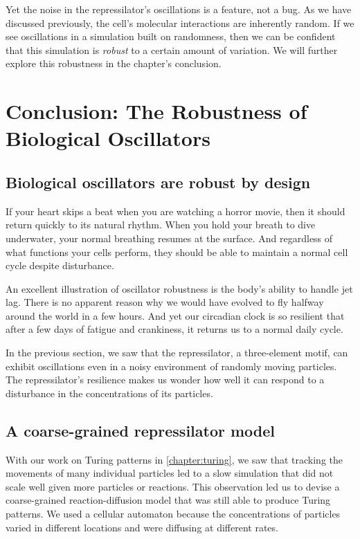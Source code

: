Yet the noise in the repressilator's oscillations is a feature, not a bug. As we have discussed previously, the cell's molecular interactions are inherently random. If we see oscillations in a simulation built on randomness, then we can be confident that this simulation is \textit{robust} to a certain amount of variation. We will further explore this robustness in the chapter's conclusion.\\

\FloatBarrier
{}

\section{Conclusion: The Robustness of Biological Oscillators}
\label{sec:biological_oscillators_must_be_robust}

\subsection{Biological oscillators are robust by design}

If your heart skips a beat when you are watching a horror movie, then it should return quickly to its natural rhythm. When you hold your breath to dive underwater, your normal breathing resumes at the surface. And regardless of what functions your cells perform, they should be able to maintain a normal cell cycle despite disturbance.

An excellent illustration of oscillator robustness is the body's ability to handle jet lag. There is no apparent reason why we would have evolved to fly halfway around the world in a few hours. And yet our circadian clock is so resilient that after a few days of fatigue and crankiness, it returns us to a normal daily cycle.

In the previous section, we saw that the repressilator, a three-element motif, can exhibit oscillations even in a noisy environment of randomly moving particles. The repressilator's resilience makes us wonder how well it can respond to a disturbance in the concentrations of its particles.

\FloatBarrier
{}
\subsection{A coarse-grained repressilator model}

With our work on Turing patterns in \autoref{chapter:turing}, we saw that tracking the movements of many individual particles led to a slow simulation that did not scale well given more particles or reactions. This observation led us to devise a coarse-grained reaction-diffusion model that was still able to produce Turing patterns. We used a cellular automaton because the concentrations of particles varied in different locations and were diffusing at different rates.

